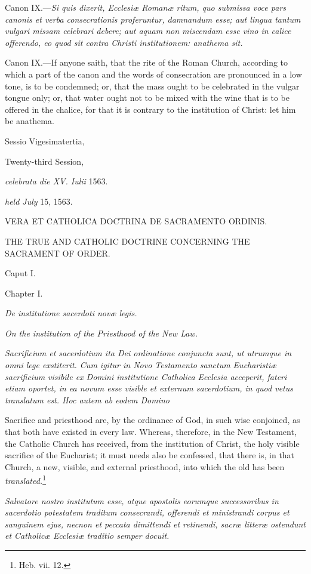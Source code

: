 Canon IX.—\emph{Si quis dixerit, Ecclesiæ Romanæ ritum, quo submissa voce pars canonis et verba consecrationis proferuntur, damnandum esse; aut lingua tantum vulgari missam celebrari debere; aut aquam non miscendam esse vino in calice offerendo, eo quod sit contra Christi institutionem: anathema sit.}

Canon IX.—If anyone saith, that the rite of the Roman Church, according to which a part of the canon and the words of consecration are pronounced in a low tone, is to be condemned; or, that the mass ought to be celebrated in the vulgar tongue only; or, that water ought not to be mixed with the wine that is to be offered in the chalice, for that it is contrary to the institution of Christ: let him be anathema.


Sessio Vigesimatertia,

Twenty-third Session,

\emph{celebrata die XV. Iulii} 1563.

\emph{held July} 15, 1563.

VERA ET CATHOLICA DOCTRINA DE SACRAMENTO ORDINIS.

THE TRUE AND CATHOLIC DOCTRINE CONCERNING THE SACRAMENT OF ORDER.

Caput I.

Chapter I.

\emph{De institutione sacerdoti novæ legis.}

\emph{ On the institution of the Priesthood of the New Law.}

\emph{Sacrificium et sacerdotium ita Dei ordinatione conjuncta sunt, ut utrumque in omni lege exstiterit. Cum igitur in Novo Testamento sanctum Eucharistiæ sacrificium visibile ex Domini institutione Catholica Ecclesia acceperit, fateri etiam oportet, in ea novum esse visible et externum sacerdotium, in quod vetus translatum est. Hoc autem ab eodem Domino }

Sacrifice and priesthood are, by the ordinance of God, in such wise conjoined, as that both have existed in every law. Whereas, therefore, in the New Testament, the Catholic Church has received, from the institution of Christ, the holy visible sacrifice of the Eucharist; it must needs also be confessed, that there is, in that Church, a new, visible, and external priesthood, into which the old has been \emph{translated.}\footnote{\par   Heb. vii. 12.}

\emph{Salvatore nostro institutum esse, atque apostolis eorumque successoribus in sacerdotio potestatem traditum consecrandi, offerendi et ministrandi corpus et sanguinem ejus, necnon et peccata dimittendi et retinendi, sacræ litteræ ostendunt et Catholicæ Ecclesiæ traditio semper docuit.}

